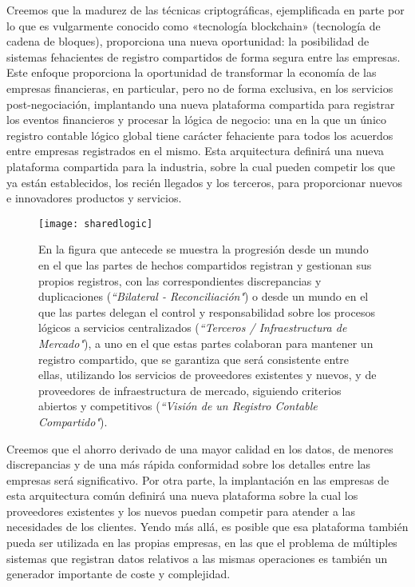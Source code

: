 \documentclass{article}
\begin{document}
Creemos que la madurez de las técnicas criptográficas, ejemplificada en parte por lo que es vulgarmente conocido como «tecnología blockchain» (tecnología de cadena de bloques), proporciona una nueva oportunidad: la posibilidad de sistemas fehacientes de registro compartidos de forma segura entre las empresas. Este enfoque proporciona la oportunidad de transformar la economía de las empresas financieras, en particular, pero no de forma exclusiva, en los servicios post-negociación, implantando una nueva plataforma compartida para registrar los eventos financieros y procesar la lógica de negocio: una en la que un único registro contable lógico global tiene carácter fehaciente para todos los acuerdos entre empresas registrados en el mismo. Esta arquitectura definirá una nueva plataforma compartida para la industria, sobre la cual pueden competir los que ya están establecidos, los recién llegados y los terceros, para proporcionar nuevos e innovadores productos y servicios. 

\begin{figure}[H]
\texttt{[image: sharedlogic]} 
\caption{En la figura que antecede se muestra la progresión desde un mundo en el que las partes de hechos compartidos registran y gestionan sus propios registros, con las correspondientes discrepancias y duplicaciones (\textit{``Bilateral - Reconciliación"}) o desde un mundo en el que las partes delegan el control y responsabilidad sobre los procesos lógicos a servicios centralizados (\textit{``Terceros / Infraestructura de Mercado"}), a uno en el que estas partes colaboran para mantener un registro compartido, que se garantiza que será consistente entre ellas, utilizando los servicios de proveedores existentes y nuevos, y de proveedores de infraestructura de mercado, siguiendo criterios abiertos y competitivos (\textit{``Visión de un Registro Contable Compartido"}).}
\end{figure}


Creemos que el ahorro derivado de una mayor calidad en los datos, de menores discrepancias y de una más rápida conformidad sobre los detalles entre las empresas será significativo. Por otra parte, la implantación en las empresas de esta arquitectura común definirá una nueva plataforma sobre la cual los proveedores existentes y los nuevos puedan competir para atender a las necesidades de los clientes. Yendo más allá, es posible que esa plataforma también pueda ser utilizada en las propias empresas, en las que el problema de múltiples sistemas que registran datos relativos a las mismas operaciones es también un generador importante de coste y complejidad.
\end{document}
